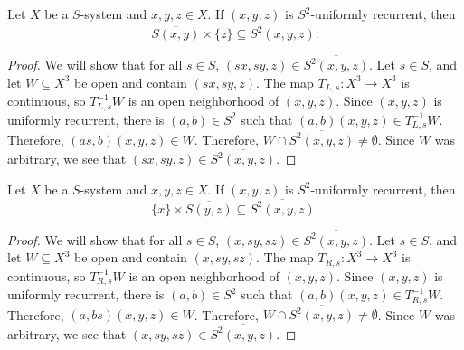 
\begin{lemma}
    \label{lemma_S_orb_closure_contained_in_S2_orbit_closure_v2}
    \leanok{}
    Let $X$ be a $S$-system and $x, y, z \in X$.  If $(x,y,z)$ is $S^2$-uniformly recurrent, then
    \[\overline{S (x,y)} \times \{z\} \subseteq \overline{S^2(x,y,z)}.\]
\end{lemma}


\begin{proof}
\leanok{}
    We will show that for all $s \in S$, $(sx,sy,z) \in \overline{S^2(x,y,z)}$.  Let $s \in S$, and let $W \subseteq X^3$ be open and contain $(sx,sy,z)$.  The map $T_{L,s}: X^3 \to X^3$ is continuous, so $T_{L,s}^{-1}W$ is an open neighborhood of $(x,y,z)$. Since $(x,y,z)$ is uniformly recurrent, there is $(a,b) \in S^2$ such that $(a,b)(x,y,z) \in T_{L,s}^{-1}W$.  Therefore, $(as,b)(x,y,z) \in W$.  Therefore, $W \cap \overline{S^2(x,y,z)} \neq \emptyset$.  Since $W$ was arbitrary, we see that $(sx,sy,z) \in \overline{S^2(x,y,z)}$.
\end{proof}

\begin{lemma}
    \label{lemma_S_orb_closure_contained_in_S2_orbit_closure_v3}
    \leanok{}
    Let $X$ be a $S$-system and $x, y, z \in X$.  If $(x,y,z)$ is $S^2$-uniformly recurrent, then
    \[\{x\} \times \overline{S (y,z)} \subseteq \overline{S^2(x,y,z)}.\]
\end{lemma}

\begin{proof}
\leanok{}
    We will show that for all $s \in S$, $(x,sy,sz) \in \overline{S^2(x,y,z)}$.  Let $s \in S$, and let $W \subseteq X^3$ be open and contain $(x,sy,sz)$.  The map $T_{R,s}: X^3 \to X^3$ is continuous, so $T_{R,s}^{-1}W$ is an open neighborhood of $(x,y,z)$. Since $(x,y,z)$ is uniformly recurrent, there is $(a,b) \in S^2$ such that $(a,b)(x,y,z) \in T_{R,s}^{-1}W$.  Therefore, $(a,bs)(x,y,z) \in W$.  Therefore, $W \cap \overline{S^2(x,y,z)} \neq \emptyset$.  Since $W$ was arbitrary, we see that $(x,sy,sz) \in \overline{S^2(x,y,z)}$.
\end{proof}

